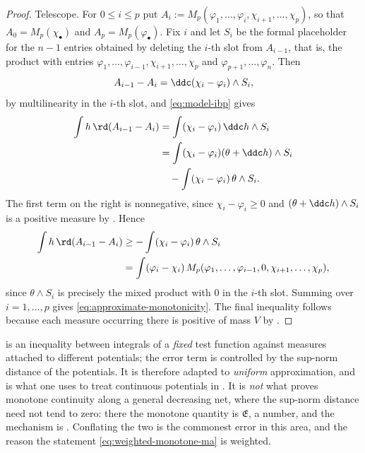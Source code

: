 \begin{proof}
Telescope.  For $0\leq i\leq p$ put
$A_i:=M_p(\varphi_1,\ldots,\varphi_i,\chi_{i+1},\ldots,\chi_p)$, so that
$A_0=M_p(\chi_\bullet)$ and $A_p=M_p(\varphi_\bullet)$.  Fix $i$ and
let $S_i$ be the formal placeholder for the $n-1$ entries obtained by deleting the
$i$-th slot from $A_{i-1}$, that is, the product with entries
$\varphi_1,\ldots,\varphi_{i-1},\chi_{i+1},\ldots,\chi_p$ and
$\varphi_{p+1},\ldots,\varphi_n$.  Then
\[
 A_{i-1}-A_i=\ddc(\chi_i-\varphi_i)\wedge S_i ,
\]
by multilinearity in the $i$-th slot, and
\eqref{eq:model-ibp} gives
\[
 \begin{aligned}
 \int h\,\rd(A_{i-1}-A_i)
 &=\int(\chi_i-\varphi_i)\,\ddc h\wedge S_i\\
 &=\int(\chi_i-\varphi_i)(\theta+\ddc h)\wedge S_i\\
 &\quad-\int(\chi_i-\varphi_i)\,\theta\wedge S_i .
 \end{aligned}
\]
The first term on the right is nonnegative, since $\chi_i-\varphi_i\geq0$
and $(\theta+\ddc h)\wedge S_i$ is a positive measure by
.  Hence
\[
 \begin{aligned}
 \int h\,\rd(A_{i-1}-A_i)
 &\geq-\int(\chi_i-\varphi_i)\,\theta\wedge S_i\\
 &=\int(\varphi_i-\chi_i)\,
   M_p(\varphi_1,\ldots,\varphi_{i-1},0,
       \chi_{i+1},\ldots,\chi_p),
 \end{aligned}
\]
since $\theta\wedge S_i$ is precisely the mixed product with $0$ in the
$i$-th slot.  Summing over $i=1,\ldots,p$ gives
\eqref{eq:approximate-monotonicity}.  The final inequality follows because
each measure occurring there is positive of mass $V$ by
.
\end{proof}

\begin{remark}
\label{rem:ch24-two-monotonicities}
 is an inequality between integrals
of a \emph{fixed} test function against measures attached to different
potentials; the error term is controlled by the sup-norm distance of the
potentials.  It is therefore adapted to \emph{uniform} approximation, and is
what one uses to treat continuous potentials in
.  It is \emph{not} what proves monotone
continuity along a general decreasing net, where the sup-norm distance need
not tend to zero: there the monotone quantity is
$\mathfrak E$, a number, and the mechanism is
.  Conflating the two is the commonest
error in this area, and the reason the statement
\eqref{eq:weighted-monotone-ma} is weighted.
\end{remark}

